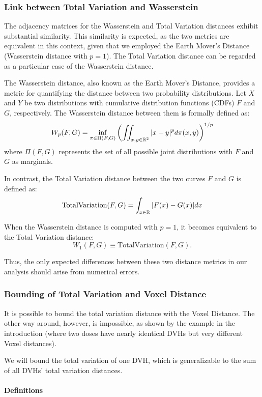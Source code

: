 \subsubsection{Link between Total Variation and Wasserstein}
The adjacency matrices for the Wasserstein and Total Variation distances exhibit substantial similarity.
This similarity is expected, as the two metrics are equivalent in this context, given that we employed the Earth Mover's Distance (Wasserstein distance with $p=1$).
The Total Variation distance can be regarded as a particular case of the Wasserstein distance.

The Wasserstein distance, also known as the Earth Mover's Distance, provides a metric for quantifying the distance between two probability distributions.
Let $X$ and $Y$ be two distributions with cumulative distribution functions (CDFs) $F$ and $G$, respectively.
The Wasserstein distance between them is formally defined as:
$$W_p(F,G) = \inf_{\pi \in \Pi(F,G)} \left( \iint_{x,y \in \mathbb{R}^2} |{x-y}|^p d\pi(x,y) \right)^{1/p}$$
where $\Pi(F,G)$ represents the set of all possible joint distributions with $F$ and $G$ as marginals.

In contrast, the Total Variation distance between the two curves $F$ and $G$ is defined as:
$$\text{TotalVariation}(F, G) = \int_{x \in \mathbb{R}} |{F(x) - G(x)}| dx$$

When the Wasserstein distance is computed with $p=1$, it becomes equivalent to the Total Variation distance:
$$W_1(F, G) \equiv \text{TotalVariation}(F, G).$$

Thus, the only expected differences between these two distance metrics in our analysis should arise from numerical errors.

\subsubsection{Bounding of Total Variation and Voxel Distance}
It is possible to bound the total variation distance with the Voxel Distance.
The other way around, however, is impossible, as shown by the example in the introduction (where two doses have nearly identical DVHs but very different Voxel distances).

We will bound the total variation of one DVH, which is generalizable to the sum of all DVHs' total variation distances.

\paragraph{Definitions}

